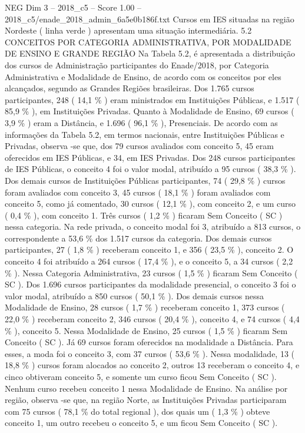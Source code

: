 \begin{textsample}{NEG Dim 3 – 2018\_c5 – Score 1.00 – 2018\_c5/enade\_2018\_admin\_6a5e0b186f.txt}
Cursos em IES situadas na região Nordeste ( linha verde ) apresentam uma situação intermediária. 5.2 CONCEITOS POR CATEGORIA ADMINISTRATIVA, POR MODALIDADE DE ENSINO E GRANDE REGIÃO Na Tabela 5.2, é apresentada a distribuição dos cursos de Administração participantes do Enade/2018, por Categoria Administrativa e Modalidade de Ensino, de acordo com os conceitos por eles alcançados, segundo as Grandes Regiões brasileiras.
Dos 1.765 cursos participantes, 248 ( 14,1 \% ) eram ministrados em Instituições Públicas, e 1.517 ( 85,9 \% ), em Instituições Privadas.
Quanto à Modalidade de Ensino, 69 cursos ( 3,9 \% ) eram a Distância, e 1.696 ( 96,1 \% ), Presenciais.
De acordo com as informações da Tabela 5.2, em termos nacionais, entre Instituições Públicas e Privadas, observa -se que, dos 79 cursos avaliados com conceito 5, 45 eram oferecidos em IES Públicas, e 34, em IES Privadas.
Dos 248 cursos participantes de IES Públicas, o conceito 4 foi o valor modal, atribuído a 95 cursos ( 38,3 \% ).
Dos demais cursos de Instituições Públicas participantes, 74 ( 29,8 \% ) cursos foram avaliados com conceito 3, 45 cursos ( 18,1 \% ) foram avaliados com conceito 5, como já comentado, 30 cursos ( 12,1 \% ), com conceito 2, e um curso ( 0,4 \% ), com conceito 1.
Três cursos ( 1,2 \% ) ficaram Sem Conceito ( SC ) nessa categoria.
Na rede privada, o conceito modal foi 3, atribuído a 813 cursos, o correspondente a 53,6 \% dos 1.517 cursos da categoria.
Dos demais cursos participantes, 27 ( 1,8 \% ) receberam conceito 1, e 356 ( 23,5 \% ), conceito 2.
O conceito 4 foi atribuído a 264 cursos ( 17,4 \% ), e o conceito 5, a 34 cursos ( 2,2 \% ).
Nessa Categoria Administrativa, 23 cursos ( 1,5 \% ) ficaram Sem Conceito ( SC ).
Dos 1.696 cursos participantes da modalidade presencial, o conceito 3 foi o valor modal, atribuído a 850 cursos ( 50,1 \% ).
Dos demais cursos nessa Modalidade de Ensino, 28 cursos ( 1,7 \% ) receberam conceito 1, 373 cursos ( 22,0 \% ) receberam conceito 2, 346 cursos ( 20,4 \% ), conceito 4, e 74 cursos ( 4,4 \% ), conceito 5.
Nessa Modalidade de Ensino, 25 cursos ( 1,5 \% ) ficaram Sem Conceito ( SC ).
Já 69 cursos foram oferecidos na modalidade a Distância.
Para esses, a moda foi o conceito 3, com 37 cursos ( 53,6 \% ).
Nessa modalidade, 13 ( 18,8 \% ) cursos foram alocados ao conceito 2, outros 13 receberam o conceito 4, e cinco obtiveram conceito 5, e somente um curso ficou Sem Conceito ( SC ).
Nenhum curso recebeu conceito 1 nessa Modalidade de Ensino.
Na análise por região, observa -se que, na região Norte, as Instituições Privadas participaram com 75 cursos ( 78,1 \% do total regional ), dos quais um ( 1,3 \% ) obteve conceito 1, um outro recebeu o conceito 5, e um ficou Sem Conceito ( SC ).

\end{textsample}
